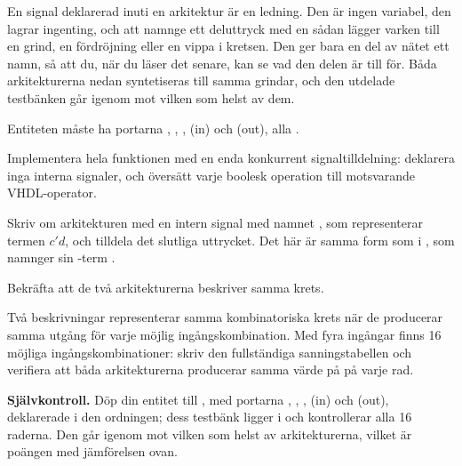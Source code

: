 En signal deklarerad inuti en arkitektur är en ledning. Den är ingen variabel, den lagrar
ingenting, och att namnge ett deluttryck med en sådan lägger varken till en grind, en fördröjning
eller en vippa i kretsen. Den ger bara en del av nätet ett namn, så att du, när du läser det
senare, kan se vad den delen är till för. Båda arkitekturerna nedan syntetiseras till samma
grindar, och den utdelade testbänken går igenom mot vilken som helst av dem.

Entiteten måste ha portarna , , ,  (in) och  (out), alla
.

 Implementera hela funktionen med en enda konkurrent signaltilldelning: deklarera inga
interna signaler, och översätt varje boolesk operation till motsvarande VHDL-operator.

 Skriv om arkitekturen med en intern signal med namnet , som representerar termen
$c'd$, och tilldela  det slutliga uttrycket. Det här är samma form som
 i , som namnger sin -term .

Bekräfta att de två arkitekturerna beskriver samma krets.

\note[Tips]Två beskrivningar representerar samma kombinatoriska krets när de producerar samma
utgång för varje möjlig ingångskombination. Med fyra ingångar finns 16 möjliga
ingångskombinationer: skriv den fullständiga sanningstabellen och verifiera att båda arkitekturerna
producerar samma värde på  på varje rad.


\begin{selfcheck}
\textbf{Självkontroll.} Döp din entitet till , med portarna , ,
,  (in) och  (out), deklarerade i den ordningen; dess testbänk ligger i
 och kontrollerar alla 16 raderna. Den går igenom mot vilken som helst
av arkitekturerna, vilket är poängen med jämförelsen ovan.
\end{selfcheck}
